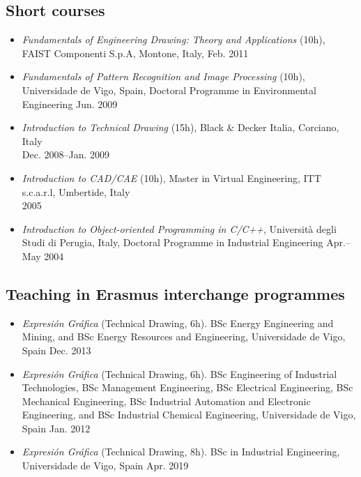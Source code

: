 \documentclass[11pt]{article}
\begin{document}
\subsection*{Short courses}

\begin{itemize}
	\item \emph{Fundamentals of Engineering Drawing: Theory and Applications} (10h), FAIST Componenti S.p.A, Montone, Italy, \mbox{} \hfill Feb. 2011
	\item \emph{Fundamentals of Pattern Recognition and Image Processing} (10h), Universidade de Vigo, Spain, Doctoral Programme in Environmental Engineering \mbox{} \hfill Jun. 2009
	\item \emph{Introduction to Technical Drawing} (15h), Black \& Decker Italia, Corciano, Italy \\ \mbox{}  \hfill Dec. 2008--Jan. 2009
	\item \emph{Introduction to CAD/CAE} (10h), Master in Virtual Engineering, ITT s.c.a.r.l, Umbertide, Italy \\ \mbox{} \hfill 2005
	\item \emph{Introduction to Object-oriented Programming in C/C++}, Università degli Studi di Perugia, Italy, Doctoral Programme in Industrial Engineering \mbox{} \hfill Apr.--May 2004
\end{itemize}

\subsection*{Teaching in Erasmus interchange programmes}

\begin{itemize}
	\item \emph{Expresión Gráfica} (Technical Drawing, 6h). BSc Energy Engineering and Mining, and BSc Energy Resources and Engineering, Universidade de Vigo, Spain \hfill Dec. 2013 
	\item \emph{Expresión Gráfica} (Technical Drawing, 6h). BSc Engineering of Industrial Technologies, BSc Management Engineering, BSc Electrical Engineering, BSc Mechanical Engineering, BSc Industrial Automation and Electronic Engineering, and BSc Industrial Chemical Engineering, Universidade de Vigo, Spain \hfill Jan. 2012
	\item \emph{Expresión Gráfica} (Technical Drawing, 8h). BSc in Industrial Engineering, Universidade de Vigo, Spain \hfill Apr. 2019
\end{itemize}
\end{document}
